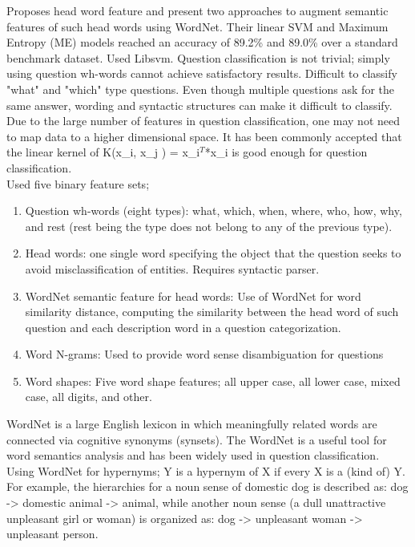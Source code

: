 Proposes head word feature and present two approaches to augment semantic features of such head words using WordNet. 
Their linear SVM and Maximum Entropy (ME) models reached an accuracy of 89.2\% and 89.0\% over a standard benchmark dataset. 
Used Libsvm.
Question classification is not trivial; simply using question wh-words cannot achieve satisfactory results. 
Difficult to classify "what" and "which" type questions. 
Even though multiple questions ask for the same answer, wording and syntactic structures can make it difficult to classify.
Due to the large number of features in question classification, one may not need to map data to a higher dimensional space. 
It has been commonly accepted that the linear kernel of
	K(x\_i, x\_j ) = x\_i$^{T}$*x\_i 
is good enough for question classification. \\
Used five binary feature sets; 
\begin{enumerate}
	\item Question wh-words (eight types): what, which, when, where, who, how, why, and rest (rest being the type does not belong to any of the previous type).
	\item Head words: one single word specifying the object that the question seeks to avoid misclassification of entities. Requires syntactic parser.
	\item WordNet semantic feature for head words: 
	Use of WordNet for word similarity distance, computing the similarity between the head word of such question and each description word in a question categorization.
	\item Word N-grams: Used to provide word sense disambiguation for questions
	\item Word shapes: Five word shape features; all upper case, all lower case, mixed case, all digits, and other.
\end{enumerate}
WordNet is a large English lexicon in which meaningfully related words are connected via cognitive synonyms (synsets).  
The WordNet is a useful tool for word semantics analysis and has been widely used in question classification. 
Using WordNet for hypernyms; Y is a hypernym of X if every X is a (kind of) Y.
For example, the hierarchies for a noun sense of domestic dog is described as: 
	dog -> domestic animal -> animal, 
while another noun sense (a dull unattractive unpleasant girl or woman)  is organized as:
	dog -> unpleasant woman -> unpleasant person.
